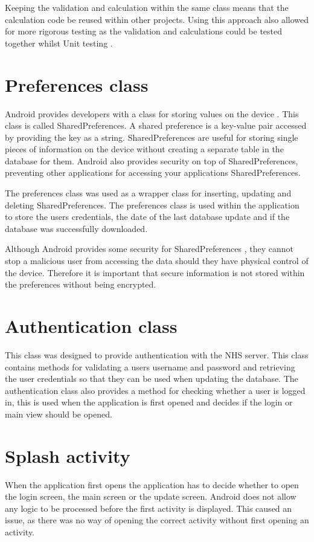 Keeping the validation and calculation within the same class means that the calculation code be reused within other projects. Using this approach also allowed for more rigorous testing as the validation and calculations could be tested together whilst Unit testing \cite{junit}.

\section{Preferences class}

Android provides developers with a class for storing values on the device \cite{android}. This class is called SharedPreferences. A shared preference \cite{shared_pref} is a key-value pair accessed by providing the key as a string. SharedPreferences are useful for storing single pieces of information on the device without creating a separate table in the database for them\cite{shared_pref}. Android also provides security on top of SharedPreferences, preventing other applications for accessing your applications SharedPreferences. 

The preferences class was used as a wrapper class for inserting, updating and deleting SharedPreferences. The preferences class is used within the application to store the users credentials, the date of the last database update and if the database was successfully downloaded.

Although Android provides some security for SharedPreferences \cite{shared_pref}, they cannot stop a malicious user from accessing the data should they have physical control of the device. Therefore it is important that secure information is not stored within the preferences without being encrypted.

\section{Authentication class}

This class was designed to provide authentication with the NHS server. This class contains methods for validating a users username and password and retrieving the user credentials so that they can be used when updating the database. The authentication class also provides a method for checking whether a user is logged in, this is used when the application is first opened and decides if the login or main view should be opened.

\section{Splash activity}
When the application first opens the application has to decide whether to open the login screen, the main screen or the update screen. Android does not allow any logic to be processed before the first activity is displayed. This caused an issue, as there was no way of opening the correct activity without first opening an activity.

